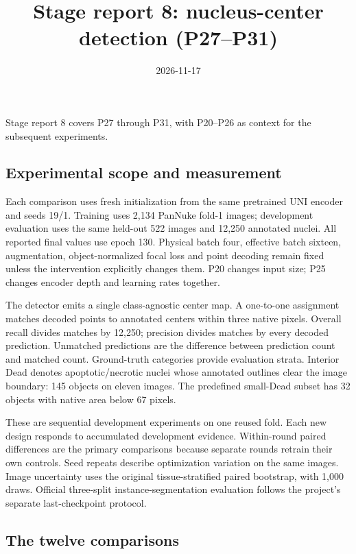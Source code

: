 \documentclass[
  11pt,
]{article}
\title{Stage report 8: nucleus-center detection (P27--P31)}
\author{}
\date{2026-11-17}
\begin{document}
\maketitle

{
\setcounter{tocdepth}{2}
\tableofcontents
}
Stage report 8 covers P27 through P31, with P20--P26 as context for the
subsequent experiments.

\subsection{Experimental scope and
measurement}\label{experimental-scope-and-measurement}

Each comparison uses fresh initialization from the same pretrained UNI
encoder and seeds 19/1. Training uses 2,134 PanNuke fold-1 images;
development evaluation uses the same held-out 522 images and 12,250
annotated nuclei. All reported final values use epoch 130. Physical
batch four, effective batch sixteen, augmentation, object-normalized
focal loss and point decoding remain fixed unless the intervention
explicitly changes them. P20 changes input size; P25 changes encoder
depth and learning rates together.

The detector emits a single class-agnostic center map. A one-to-one
assignment matches decoded points to annotated centers within three
native pixels. Overall recall divides matches by 12,250; precision
divides matches by every decoded prediction. Unmatched predictions are
the difference between prediction count and matched count. Ground-truth
categories provide evaluation strata. Interior Dead denotes
apoptotic/necrotic nuclei whose annotated outlines clear the image
boundary: 145 objects on eleven images. The predefined small-Dead subset
has 32 objects with native area below 67 pixels.

These are sequential development experiments on one reused fold. Each
new design responds to accumulated development evidence. Within-round
paired differences are the primary comparisons because separate rounds
retrain their own controls. Seed repeats describe optimization variation
on the same images. Image uncertainty uses the original
tissue-stratified paired bootstrap, with 1,000 draws. Official
three-split instance-segmentation evaluation follows the project's
separate last-checkpoint protocol.

\subsection{The twelve comparisons}\label{the-twelve-comparisons}
\end{document}
